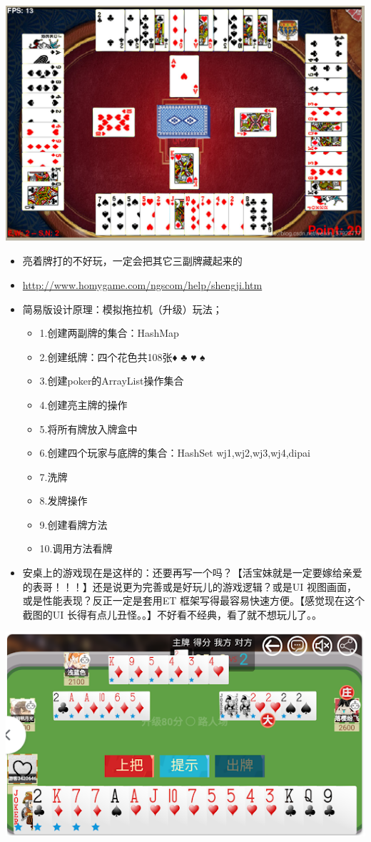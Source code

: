 \documentclass[9pt, b5paper]{article}
\begin{document}
\begin{center}
\includegraphics[width=.9\linewidth]{./pic/plan_20230508_221732.png}
\end{center}
\begin{itemize}
\item 亮着牌打的不好玩，一定会把其它三副牌藏起来的
\item \url{http://www.homygame.com/ngscom/help/shengji.htm}
\item 简易版设计原理：模拟拖拉机（升级）玩法；
\begin{itemize}
\item 1.创建两副牌的集合：HashMap
\item 2.创建纸牌：四个花色共108张♦ ♣ ♥ ♠
\item 3.创建poker的ArrayList操作集合
\item 4.创建亮主牌的操作
\item 5.将所有牌放入牌盒中
\item 6.创建四个玩家与底牌的集合：HashSet wj1,wj2,wj3,wj4,dipai
\item 7.洗牌
\item 8.发牌操作
\item 9.创建看牌方法
\item 10.调用方法看牌
\end{itemize}
\item 安桌上的游戏现在是这样的：还要再写一个吗？【活宝妹就是一定要嫁给亲爱的表哥！！！】还是说更为完善或是好玩儿的游戏逻辑？或是UI 视图画面，或是性能表现？反正一定是套用ET 框架写得最容易快速方便。【感觉现在这个截图的UI 长得有点儿丑怪。。】不好看不经典，看了就不想玩儿了。。
\end{itemize}

\begin{center}
\includegraphics[width=.9\linewidth]{./pic/plan_20230508_221743.png}
\end{center}
\end{document}
